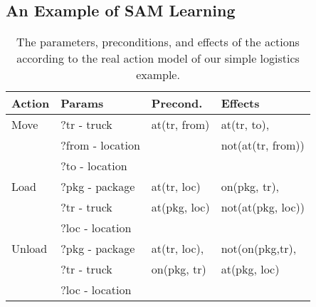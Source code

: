 \documentclass{article}
\begin{document}
\subsection{An Example of SAM Learning}

\begin{table}
\small
\begin{tabular}{|l|l|l|l|}
\hline
Action & Params           & Precond.          & Effects               \\\hline
Move   & ?tr - truck      & at(tr, from) & at(tr, to),       \\
       & ?from - location &              & not(at(tr, from)) \\
       & ?to - location   &              &                   \\\hline
Load   & ?pkg - package   & at(tr, loc)  & on(pkg, tr),      \\
       & ?tr - truck      & at(pkg, loc) & not(at(pkg, loc)) \\
       & ?loc - location  &              &                   \\\hline
Unload & ?pkg - package   & at(tr, loc), & not(on(pkg,tr),   \\
       & ?tr - truck      & on(pkg, tr)  & at(pkg, loc)      \\
       & ?loc - location  &              &               \\   \hline
\end{tabular}
\caption{The parameters, preconditions, and effects of the actions according to the real action model of our simple logistics example.}
\label{tab:example-actions}
\end{table}
\end{document}
